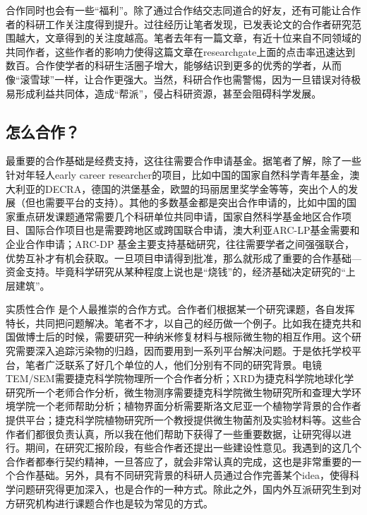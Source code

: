 \documentclass[]{book}
\begin{document}
合作同时也会有一些``福利''。除了通过合作结交志同道合的好友，还有可能让合作者的科研工作关注度得到提升。过往经历让笔者发现，已发表论文的合作者研究范围越大，文章得到的关注度越高。笔者去年有一篇文章，有近十位来自不同领域的共同作者，这些作者的影响力使得这篇文章在researchgate上面的点击率迅速达到数百。合作使学者的科研生活圈子增大，能够结识到更多的优秀的学者，从而像``滚雪球''一样，让合作更强大。当然，科研合作也需警惕，因为一旦错误对待极易形成利益共同体，造成``帮派''，侵占科研资源，甚至会阻碍科学发展。

\hypertarget{ux600eux4e48ux5408ux4f5c}{%
\subsection{怎么合作？}\label{ux600eux4e48ux5408ux4f5c}}

最重要的合作基础是经费支持，这往往需要合作申请基金。据笔者了解，除了一些针对年轻人early career researcher的项目，比如中国的国家自然科学青年基金，澳大利亚的DECRA，德国的洪堡基金，欧盟的玛丽居里奖学金等等，突出个人的发展（但也需要平台的支持）。其他的多数基金都是突出合作申请的，比如中国的国家重点研发课题通常需要几个科研单位共同申请，国家自然科学基金地区合作项目、国际合作项目也是需要跨地区或跨国联合申请，澳大利亚ARC-LP基金需要和企业合作申请；ARC-DP 基金主要支持基础研究，往往需要学者之间强强联合，优势互补才有机会获取。一旦项目申请得到批准，那么就形成了重要的合作基础---资金支持。毕竟科学研究从某种程度上说也是``烧钱''的，经济基础决定研究的``上层建筑''。

实质性合作 是个人最推崇的合作方式。合作者们根据某一个研究课题，各自发挥特长，共同把问题解决。笔者不才，以自己的经历做一个例子。比如我在捷克共和国做博士后的时候，需要研究一种纳米修复材料与根际微生物的相互作用。这个研究需要深入追踪污染物的归趋，因而要用到一系列平台解决问题。于是依托学校平台，笔者广泛联系了好几个单位的人，他们分别有不同的研究背景。电镜TEM/SEM需要捷克科学院物理所一个合作者分析；XRD为捷克科学院地球化学研究所一个老师合作分析，微生物测序需要捷克科学院微生物研究所和查理大学环境学院一个老师帮助分析；植物界面分析需要斯洛文尼亚一个植物学背景的合作者提供平台；捷克科学院植物研究所一个教授提供微生物菌剂及实验材料等。这些合作者们都很负责认真，所以我在他们帮助下获得了一些重要数据，让研究得以进行。期间，在研究汇报阶段，有些合作者还提出一些建设性意见。我遇到的这几个合作者都奉行契约精神，一旦答应了，就会非常认真的完成，这也是非常重要的一个合作基础。另外，具有不同研究背景的科研人员通过合作完善某个idea，使得科学问题研究得更加深入，也是合作的一种方式。除此之外，国内外互派研究生到对方研究机构进行课题合作也是较为常见的方式。
\end{document}
